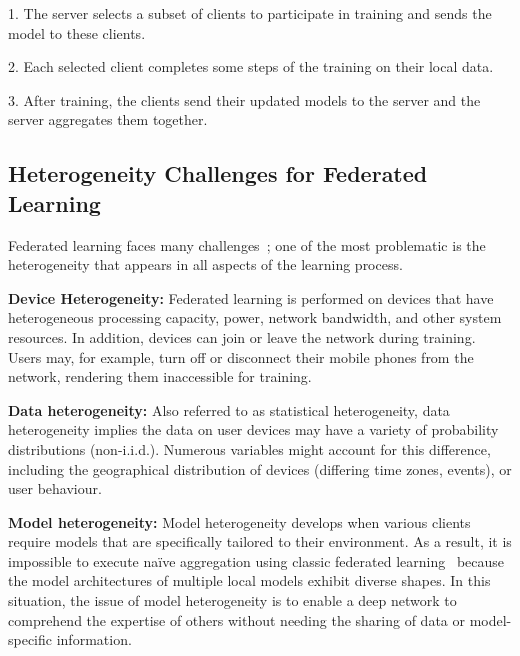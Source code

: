 \documentclass[withindex,glossary,firstyr]{cam-thesis}
\begin{document}
1. The server selects a subset of clients to participate in training and sends the model to these clients.

2. Each selected client completes some steps of the training on their local data.

3. After training, the clients send their updated models to the server and the server aggregates them together.



\subsection{Heterogeneity Challenges for Federated Learning}
\label{sec:hetero_challenges}

Federated learning faces many challenges~\cite{li2020federated}; one of the most problematic is the heterogeneity that appears in all aspects of the learning process.

\textbf{Device Heterogeneity:} Federated learning is performed on devices that have heterogeneous processing capacity, power, network bandwidth, and other system resources. In addition, devices can join or leave the network during training. Users may, for example, turn off or disconnect their mobile phones from the network, rendering them inaccessible for training. 

\textbf{Data heterogeneity:} Also referred to as statistical heterogeneity, data heterogeneity implies the data on user devices may have a variety of probability distributions (non-i.i.d.). Numerous variables might account for this difference, including the geographical distribution of devices (differing time zones, events), or user behaviour. 

\textbf{Model heterogeneity:} Model heterogeneity develops when various clients require models that are specifically tailored to their environment.
As a result, it is impossible to execute naïve aggregation using classic federated learning~\cite{wu2020personalized} because the model architectures of multiple local models exhibit diverse shapes. In this situation, the issue of model heterogeneity is to enable a deep network to comprehend the expertise of others without needing the sharing of data or model-specific information.
\end{document}
